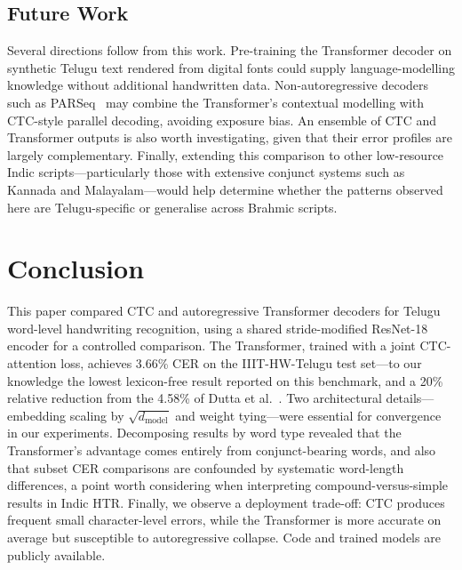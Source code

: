 \documentclass[pdflatex,sn-mathphys-num]{sn-jnl}
\begin{document}
\subsection{Future Work}\label{sec:discussion:future}

Several directions follow from this work. Pre-training the Transformer decoder on synthetic Telugu text rendered from digital fonts could supply language-modelling knowledge without additional handwritten data. Non-autoregressive decoders such as PARSeq~\cite{bautista2022parseq} may combine the Transformer's contextual modelling with CTC-style parallel decoding, avoiding exposure bias. An ensemble of CTC and Transformer outputs is also worth investigating, given that their error profiles are largely complementary. Finally, extending this comparison to other low-resource Indic scripts---particularly those with extensive conjunct systems such as Kannada and Malayalam---would help determine whether the patterns observed here are Telugu-specific or generalise across Brahmic scripts.

\section{Conclusion}\label{sec:conclusion}

This paper compared CTC and autoregressive Transformer decoders for Telugu word-level handwriting recognition, using a shared stride-modified ResNet-18 encoder for a controlled comparison. The Transformer, trained with a joint CTC-attention loss, achieves 3.66\% CER on the IIIT-HW-Telugu test set---to our knowledge the lowest lexicon-free result reported on this benchmark, and a 20\% relative reduction from the 4.58\% of Dutta et al.~\cite{dutta2018}. Two architectural details---embedding scaling by $\sqrt{d_{\text{model}}}$ and weight tying---were essential for convergence in our experiments. Decomposing results by word type revealed that the Transformer's advantage comes entirely from conjunct-bearing words, and also that subset CER comparisons are confounded by systematic word-length differences, a point worth considering when interpreting compound-versus-simple results in Indic HTR. Finally, we observe a deployment trade-off: CTC produces frequent small character-level errors, while the Transformer is more accurate on average but susceptible to autoregressive collapse. Code and trained models are publicly available.
\end{document}
